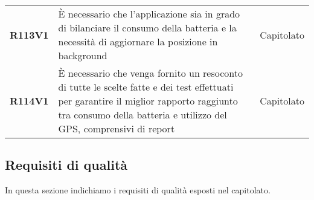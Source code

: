 \documentclass[../analisi-dei-requisiti.tex]{subfiles}
\begin{document}
\begin{longtable}[H]{>{\centering\bfseries}m{3cm} >{\centering}m{10cm} >{\centering\arraybackslash}m{3cm}}
  R113V1                               & È necessario che l'applicazione sia in grado di bilanciare il consumo della batteria e la necessità di aggiornare la posizione in background                                                                                                           & Capitolato                    \\
  R114V1                               & È necessario che venga fornito un resoconto di tutte le scelte fatte e dei test effettuati per garantire il miglior rapporto raggiunto tra consumo della batteria e utilizzo del GPS, comprensivi di report                                            & Capitolato                    \\
\end{longtable}

\newpage
\subsection{Requisiti di qualità}%
\label{sub:requisiti_di_qualita}
In questa sezione indichiamo i requisiti di qualità esposti nel capitolato.
\end{document}
